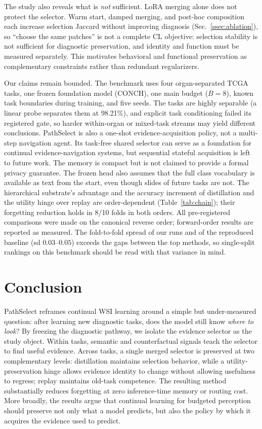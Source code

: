 \documentclass{article}
\begin{document}
The study also reveals what is \emph{not} sufficient.
LoRA merging alone does not protect the selector.
Warm start, damped merging, and post-hoc composition each increase selection Jaccard without improving diagnosis (Sec.~\ref{ssec:ablation}), so ``choose the same patches'' is not a complete CL objective: selection stability is not sufficient for diagnostic preservation, and identity and function must be measured separately.
This motivates behavioral and functional preservation as complementary constraints rather than redundant regularizers.

Our claims remain bounded.
The benchmark uses four organ-separated TCGA tasks, one frozen foundation model (CONCH), one main budget ($B=8$), known task boundaries during training, and five seeds.
The tasks are highly separable (a linear probe separates them at 98.21\%), and explicit task conditioning failed its registered gate, so harder within-organ or mixed-task streams may yield different conclusions.
PathSelect is also a one-shot evidence-acquisition policy, not a multi-step navigation agent.
Its task-free shared selector can serve as a foundation for continual evidence-navigation systems, but sequential stateful acquisition is left to future work. The memory is compact but is not claimed to provide a formal privacy guarantee. The frozen head also assumes that the full class vocabulary is available as text from the start, even though slides of future tasks are not. The hierarchical substrate's advantage and the accuracy increment of distillation and the utility hinge over replay are order-dependent (Table~\ref{tab:chain}); their forgetting reduction holds in 8/10 folds in both orders. All pre-registered comparisons were made on the canonical reverse order; forward-order results are reported as measured. The fold-to-fold spread of our runs and of the reproduced baseline (sd $0.03$--$0.05$) exceeds the gaps between the top methods, so single-split rankings on this benchmark should be read with that variance in mind.

\section{Conclusion}

PathSelect reframes continual WSI learning around a simple but under-measured question: after learning new diagnostic tasks, does the model still know \emph{where to look}?
By freezing the diagnostic pathway, we isolate the evidence selector as the study object.
Within tasks, semantic and counterfactual signals teach the selector to find useful evidence.
Across tasks, a single merged selector is preserved at two complementary levels: distillation maintains selection behavior, while a utility-preservation hinge allows evidence identity to change without allowing usefulness to regress; replay maintains old-task competence.
The resulting method substantially reduces forgetting at zero inference-time memory or routing cost.
More broadly, the results argue that continual learning for budgeted perception should preserve not only what a model predicts, but also the policy by which it acquires the evidence used to predict.



\end{document}
